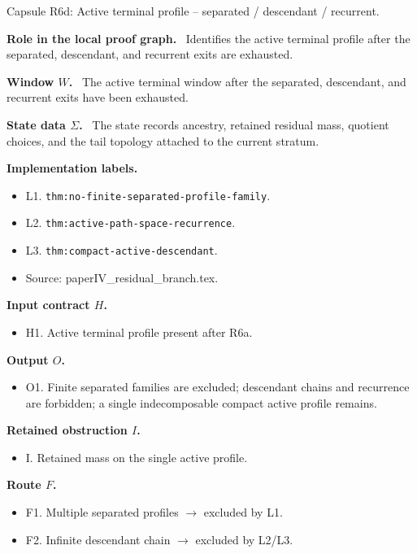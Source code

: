 \documentclass[11pt]{amsart}
\newcommand{\capsulefield}[1]{\par\smallskip\noindent\textbf{#1.}\ }
\begin{document}
\begin{proofcapsule}{Capsule R6d: Active terminal profile -- separated / descendant / recurrent.}
  \capsulefield{Role in the local proof graph}
  Identifies the active terminal profile after the separated, descendant, and recurrent exits are exhausted.

  \capsulefield{Window \(W\)}
The active terminal window after the separated, descendant, and recurrent exits have been exhausted.

  \capsulefield{State data \(\Sigma\)}
The state records ancestry, retained residual mass, quotient choices, and the tail topology attached to the current stratum.

  \capsulefield{Implementation labels}
  \begin{itemize}[leftmargin=1.8em]
  \item L1. \texttt{thm:no-finite-separated-profile-family}.
  \item L2. \texttt{thm:active-path-space-recurrence}.
  \item L3. \texttt{thm:compact-active-descendant}.
  \item Source: paperIV\_residual\_branch.tex.
  \end{itemize}

  \capsulefield{Input contract \(H\)}
  \begin{itemize}[leftmargin=1.8em]
  \item H1. Active terminal profile present after R6a.
  \end{itemize}

  \capsulefield{Output \(O\)}
  \begin{itemize}[leftmargin=1.8em]
  \item O1. Finite separated families are excluded; descendant chains and recurrence are forbidden; a single indecomposable compact active profile remains.
  \end{itemize}

  \capsulefield{Retained obstruction \(I\)}
  \begin{itemize}[leftmargin=1.8em]
  \item I. Retained mass on the single active profile.
  \end{itemize}

  \capsulefield{Route \(F\)}
  \begin{itemize}[leftmargin=1.8em]
  \item F1. Multiple separated profiles $\to$ excluded by L1.
  \item F2. Infinite descendant chain $\to$ excluded by L2/L3.
  \end{itemize}


\end{proofcapsule}
\end{document}
